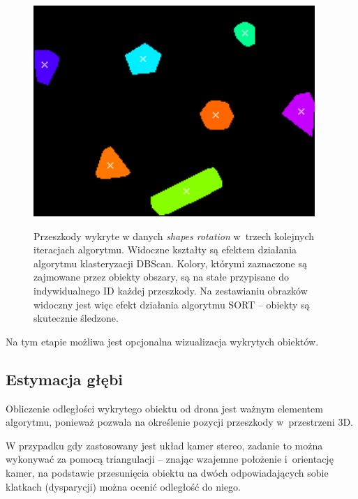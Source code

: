 \begin{figure}
\begin{minipage}{0.33\textwidth}
        \includegraphics[width = 0.95\textwidth]{images/tracking3.png}
        \label{gra:tracking3}
    \end{minipage}
    \caption{Przeszkody wykryte w danych \textit{shapes rotation} w~trzech kolejnych iteracjach algorytmu. Widoczne kształty są efektem działania algorytmu klasteryzacji DBScan. Kolory, którymi zaznaczone są zajmowane przez obiekty obszary, są na stałe przypisane do indywidualnego ID każdej przeszkody. Na zestawianiu obrazków widoczny jest więc efekt działania algorytmu SORT -- obiekty są skutecznie śledzone.}
    \label{fig:tracking}
\end{figure}

Na tym etapie możliwa jest opcjonalna wizualizacja wykrytych obiektów.

\subsection{Estymacja głębi}

Obliczenie odległości wykrytego obiektu od drona jest ważnym elementem algorytmu, ponieważ pozwala na określenie pozycji przeszkody w~przestrzeni 3D.

W przypadku gdy zastosowany jest układ kamer stereo, zadanie to można wykonywać za pomocą triangulacji -- znając wzajemne położenie i~orientację kamer, na podstawie przesunięcia obiektu na dwóch odpowiadających sobie klatkach (dysparycji) można ocenić odległość do niego.

